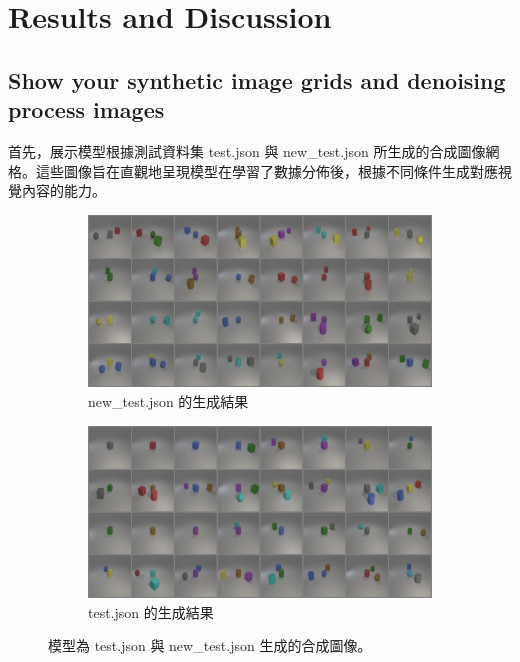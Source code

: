 \section{Results and Discussion}

\subsection{Show your synthetic image grids and denoising process images}

首先，展示模型根據測試資料集 test.json 與 new\_test.json 所生成的合成圖像網格。這些圖像旨在直觀地呈現模型在學習了數據分佈後，根據不同條件生成對應視覺內容的能力。

\begin{figure}[H]
    \centering
    \begin{subfigure}[b]{0.8\textwidth}
        \centering
        \includegraphics[width=\textwidth]{figures/new_test_result.png}
        \caption{new\_test.json 的生成結果}
        \label{fig:new_test_result}
    \end{subfigure}
    \vspace{1em} %
    \begin{subfigure}[b]{0.8\textwidth}
        \centering
        \includegraphics[width=\textwidth]{figures/test_result.png}
        \caption{test.json 的生成結果}
        \label{fig:test_result}
    \end{subfigure}
    \caption{模型為 test.json 與 new\_test.json 生成的合成圖像。}
    \label{fig:synthetic_images_grids}
\end{figure}

